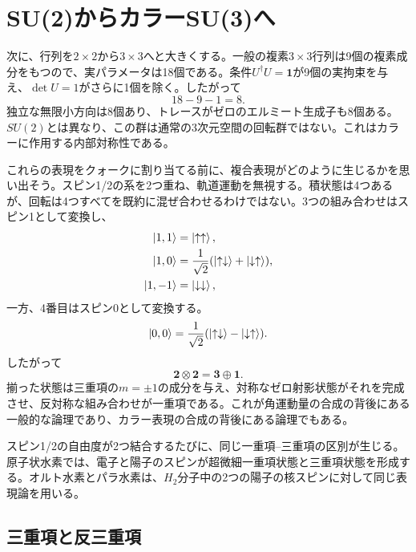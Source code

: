 \section{SU(2)からカラーSU(3)へ}

次に、行列を\(2\times2\)から\(3\times3\)へと大きくする。一般の複素\(3\times3\)行列は9個の複素成分をもつので、実パラメータは18個である。条件\(U^\dagger U=\boldsymbol 1\)が9個の実拘束を与え、\(\det U=1\)がさらに1個を除く。したがって
\begin{equation}
18-9-1=8.
\end{equation}
独立な無限小方向は8個あり、トレースがゼロのエルミート生成子も8個ある。\(SU(2)\)とは異なり、この群は通常の3次元空間の回転群ではない。これはカラーに作用する内部対称性である。

これらの表現をクォークに割り当てる前に、複合表現がどのように生じるかを思い出そう。スピン1/2の系を2つ重ね、軌道運動を無視する。積状態は4つあるが、回転は4つすべてを既約に混ぜ合わせるわけではない。3つの組み合わせはスピン1として変換し、
\begin{align}
\left\lvert1,1\right\rangle&=\left\lvert\uparrow\uparrow\right\rangle,\\
\left\lvert1,0\right\rangle&=\frac{1}{\sqrt2}
(\left\lvert\uparrow\downarrow\right\rangle+\left\lvert\downarrow\uparrow\right\rangle),\\
\left\lvert1,-1\right\rangle&=\left\lvert\downarrow\downarrow\right\rangle,
\end{align}
一方、4番目はスピン0として変換する。
\begin{equation}
\left\lvert0,0\right\rangle=\frac{1}{\sqrt2}
(\left\lvert\uparrow\downarrow\right\rangle-\left\lvert\downarrow\uparrow\right\rangle).
\end{equation}
したがって
\begin{equation}
\boldsymbol 2\otimes\boldsymbol 2
=\boldsymbol 3\oplus\boldsymbol 1.
\label{eq:l4-two-spin-decomposition}
\end{equation}
揃った状態は三重項の\(m=\pm1\)の成分を与え、対称なゼロ射影状態がそれを完成させ、反対称な組み合わせが一重項である。これが角運動量の合成の背後にある一般的な論理であり、カラー表現の合成の背後にある論理でもある。

スピン1/2の自由度が2つ結合するたびに、同じ一重項--三重項の区別が生じる。原子状水素では、電子と陽子のスピンが超微細一重項状態と三重項状態を形成する。オルト水素とパラ水素は、\(H_2\)分子中の2つの陽子の核スピンに対して同じ表現論を用いる。

\subsection{三重項と反三重項}

